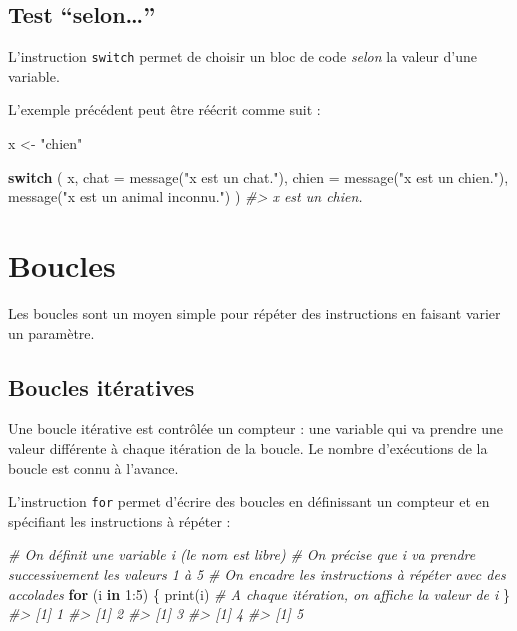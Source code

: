 \documentclass[
  french,
]{scrbook}
\newenvironment{Shaded}{\begin{snugshade}}{\end{snugshade}}
\newcommand{\AttributeTok}[1]{\textcolor[rgb]{0.77,0.63,0.00}{#1}}
\newcommand{\CommentTok}[1]{\textcolor[rgb]{0.56,0.35,0.01}{\textit{#1}}}
\newcommand{\ControlFlowTok}[1]{\textcolor[rgb]{0.13,0.29,0.53}{\textbf{#1}}}
\newcommand{\DecValTok}[1]{\textcolor[rgb]{0.00,0.00,0.81}{#1}}
\newcommand{\FunctionTok}[1]{\textcolor[rgb]{0.00,0.00,0.00}{#1}}
\newcommand{\NormalTok}[1]{#1}
\newcommand{\OtherTok}[1]{\textcolor[rgb]{0.56,0.35,0.01}{#1}}
\newcommand{\SpecialCharTok}[1]{\textcolor[rgb]{0.00,0.00,0.00}{#1}}
\newcommand{\StringTok}[1]{\textcolor[rgb]{0.31,0.60,0.02}{#1}}
\begin{document}
\hypertarget{test-selon}{%
\subsection{\texorpdfstring{Test ``selon\ldots{}''}{Test ``selon\ldots''}}\label{test-selon}}

L'instruction \texttt{switch} permet de choisir un bloc de code \emph{selon} la valeur d'une variable.

L'exemple précédent peut être réécrit comme suit :

\begin{Shaded}
\begin{Highlighting}[]
\NormalTok{x }\OtherTok{\textless{}{-}} \StringTok{"chien"}

\ControlFlowTok{switch}\NormalTok{ (}
\NormalTok{  x,}
  \AttributeTok{chat =} \FunctionTok{message}\NormalTok{(}\StringTok{"x est un chat."}\NormalTok{),}
  \AttributeTok{chien =} \FunctionTok{message}\NormalTok{(}\StringTok{"x est un chien."}\NormalTok{),}
  \FunctionTok{message}\NormalTok{(}\StringTok{"x est un animal inconnu."}\NormalTok{)}
\NormalTok{)}
\CommentTok{\#\textgreater{} x est un chien.}
\end{Highlighting}
\end{Shaded}

\hypertarget{boucles}{%
\section{Boucles}\label{boucles}}

Les boucles sont un moyen simple pour répéter des instructions en faisant varier un paramètre.

\hypertarget{boucles-ituxe9ratives}{%
\subsection{Boucles itératives}\label{boucles-ituxe9ratives}}

Une boucle itérative est contrôlée un compteur : une variable qui va prendre une valeur différente à chaque itération de la boucle. Le nombre d'exécutions de la boucle est connu à l'avance.

L'instruction \texttt{for} permet d'écrire des boucles en définissant un compteur et en spécifiant les instructions à répéter :

\begin{Shaded}
\begin{Highlighting}[]
\CommentTok{\# On définit une variable i (le nom est libre)}
\CommentTok{\# On précise que i va prendre successivement les valeurs 1 à 5}
\CommentTok{\# On encadre les instructions à répéter avec des accolades}
\ControlFlowTok{for}\NormalTok{ (i }\ControlFlowTok{in} \DecValTok{1}\SpecialCharTok{:}\DecValTok{5}\NormalTok{) \{}
  \FunctionTok{print}\NormalTok{(i) }\CommentTok{\# A chaque itération, on affiche la valeur de i}
\NormalTok{\}}
\CommentTok{\#\textgreater{} [1] 1}
\CommentTok{\#\textgreater{} [1] 2}
\CommentTok{\#\textgreater{} [1] 3}
\CommentTok{\#\textgreater{} [1] 4}
\CommentTok{\#\textgreater{} [1] 5}
\end{Highlighting}
\end{Shaded}
\end{document}
